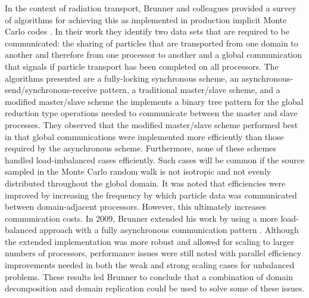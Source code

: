 In the context of radiation transport, Brunner and colleagues provided
a survey of algorithms for achieving this as implemented in production
implicit Monte Carlo codes \citep{brunner_comparison_2006}. In their
work they identify two data sets that are required to be communicated:
the sharing of particles that are transported from one domain to
another and therefore from one processor to another and a global
communication that signals if particle transport has been completed on
all processors. The algorithms presented are a fully-locking
synchronous scheme, an asynchronous-send/synchronous-receive pattern,
a traditional master/slave scheme, and a modified master/slave scheme
the implements a binary tree pattern for the global reduction type
operations needed to communicate between the master and slave
processes. They observed that the modified master/slave scheme
performed best in that global communications were implemented more
efficiently than those required by the asynchronous
scheme. Furthermore, none of these schemes handled load-imbalanced
cases efficiently. Such cases will be common if the source sampled in
the Monte Carlo random walk is not isotropic and not evenly
distributed throughout the global domain. It was noted that
efficiencies were improved by increasing the frequency by which
particle data was communicated between domain-adjacent
processors. However, this ultimately increases communication costs. In
2009, Brunner extended his work by using a more load-balanced approach
with a fully asynchronous communication pattern
\citep{brunner_efficient_2009}. Although the extended implementation
was more robust and allowed for scaling to larger numbers of
processors, performance issues were still noted with parallel
efficiency improvements needed in both the weak and strong scaling
cases for unbalanced problems. These results led Brunner to conclude
that a combination of domain decomposition and domain replication
could be used to solve some of these issues.


